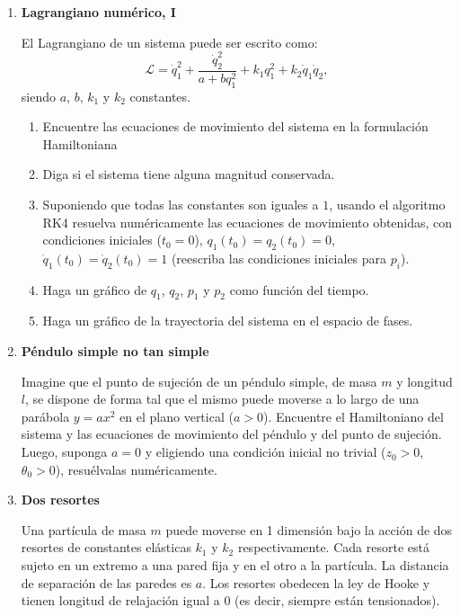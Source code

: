 \documentclass[a4paper,12pt]{article}
\begin{document}
\begin{enumerate}
  \item {\bf{Lagrangiano numérico, I}}

    El Lagrangiano de un sistema puede ser escrito como: 
    \[ \mathcal{L} = \dot q_1^2 + \frac{\dot q_2^2}{a + b q_1^2}  + k_1 q_1^2 +
    k_2 \dot q_1 \dot q_2, \]
    siendo $a$, $b$, $k_1$ y $k_2$ constantes. 
    \begin{enumerate}
      \item Encuentre las ecuaciones de movimiento del sistema en la
        formulación Hamiltoniana
      \item Diga si el sistema tiene alguna magnitud conservada. 
      \item Suponiendo que todas las constantes son iguales a $1$, usando el
        algoritmo RK4 resuelva numéricamente las ecuaciones de movimiento
        obtenidas, con condiciones iniciales ($t_0=0$), $q_1(t_0)=q_2(t_0)=0$,
        $\dot q_1(t_0)=\dot q_2(t_0)=1$ (reescriba las condiciones iniciales
        para $p_i$).
      \item Haga un gráfico de $q_1$, $q_2$, $p_1$ y $p_2$ como función del
        tiempo.
      \item Haga un gráfico de la trayectoria del sistema en el espacio de
        fases. 
    \end{enumerate}

  \item {\bf{Péndulo simple no tan simple}}

    Imagine que el punto de sujeción de un péndulo simple, de masa $m$ y
    longitud $l$, se dispone de forma tal que el mismo puede moverse a lo largo
    de una parábola $y=a x^2$ en el plano vertical ($a>0$). Encuentre el
    Hamiltoniano del sistema y las ecuaciones de movimiento del péndulo y del
    punto de sujeción. Luego, suponga $a=0$ y eligiendo una condición inicial
    no trivial ($z_0>0$, $\theta_0>0$), resuélvalas numéricamente. 
  
  \item {\bf{Dos resortes}} 
    
    Una partícula de masa $m$ puede moverse en 1 dimensión bajo la acción de
    dos resortes de constantes elásticas $k_1$ y $k_2$ respectivamente. Cada
    resorte está sujeto en un extremo a una pared fija y en el otro a la
    partícula. La distancia de separación de las paredes es $a$. Los resortes
    obedecen la ley de Hooke y tienen longitud de relajación igual a 0 (es
    decir, siempre están tensionados).


\end{enumerate}
\end{document}
